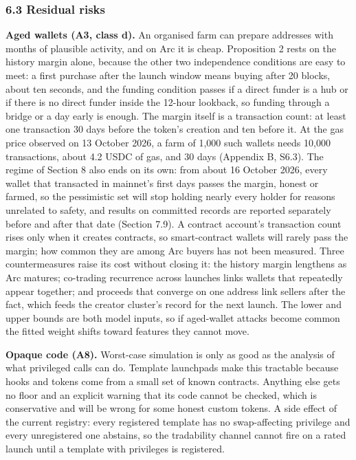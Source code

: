\subsubsection{6.3 Residual risks}\label{residual-risks}

\textbf{Aged wallets (A3, class d).} An organised farm can prepare addresses with months of plausible activity, and on Arc it is cheap. Proposition 2 rests on the history margin alone, because the other two independence conditions are easy to meet: a first purchase after the launch window means buying after 20 blocks, about ten seconds, and the funding condition passes if a direct funder is a hub or if there is no direct funder inside the 12-hour lookback, so funding through a bridge or a day early is enough. The margin itself is a transaction count: at least one transaction 30 days before the token's creation and ten before it. At the gas price observed on 13 October 2026, a farm of 1,000 such wallets needs 10,000 transactions, about 4.2 USDC of gas, and 30 days (Appendix B, S6.3). The regime of Section 8 also ends on its own: from about 16 October 2026, every wallet that transacted in mainnet's first days passes the margin, honest or farmed, so the pessimistic set will stop holding nearly every holder for reasons unrelated to safety, and results on committed records are reported separately before and after that date (Section 7.9). A contract account's transaction count rises only when it creates contracts, so smart-contract wallets will rarely pass the margin; how common they are among Arc buyers has not been measured. Three countermeasures raise its cost without closing it: the history margin lengthens as Arc matures; co-trading recurrence across launches links wallets that repeatedly appear together; and proceeds that converge on one address link sellers after the fact, which feeds the creator cluster's record for the next launch. The lower and upper bounds are both model inputs, so if aged-wallet attacks become common the fitted weight shifts toward features they cannot move.

\textbf{Opaque code (A8).} Worst-case simulation is only as good as the analysis of what privileged calls can do. Template launchpads make this tractable because hooks and tokens come from a small set of known contracts. Anything else gets no floor and an explicit warning that its code cannot be checked, which is conservative and will be wrong for some honest custom tokens. A side effect of the current registry: every registered template has no swap-affecting privilege and every unregistered one abstains, so the tradability channel cannot fire on a rated launch until a template with privileges is registered.

